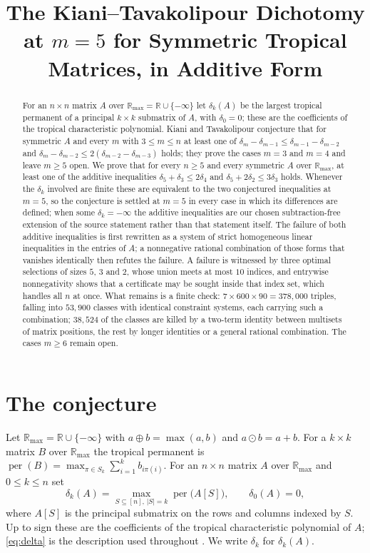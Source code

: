 \documentclass[11pt]{amsart}
\title[The Kiani--Tavakolipour dichotomy at $m=5$, in additive form]
{The Kiani--Tavakolipour Dichotomy at $m=5$ for Symmetric Tropical Matrices,
in Additive Form}
\date{}
\newcommand{\Rmax}{\mathbb R_{\max}}
\newcommand{\dd}{\delta}
\newcommand{\per}{\operatorname{per}}
\begin{document}
\begin{abstract}
For an $n\times n$ matrix $A$ over $\Rmax=\mathbb R\cup\{-\infty\}$ let
$\dd_k(A)$ be the largest tropical permanent of a principal $k\times k$
submatrix of $A$, with $\dd_0=0$; these are the coefficients of the tropical
characteristic polynomial. Kiani and Tavakolipour conjecture that for symmetric
$A$ and every $m$ with $3\le m\le n$ at least one of
$\dd_m-\dd_{m-1}\le\dd_{m-1}-\dd_{m-2}$ and
$\dd_m-\dd_{m-2}\le2(\dd_{m-2}-\dd_{m-3})$ holds; they prove the cases $m=3$ and
$m=4$ and leave $m\ge5$ open. We prove that for every $n\ge5$ and every
symmetric $A$ over $\Rmax$, at least one of the additive inequalities
$\dd_5+\dd_3\le2\dd_4$ and $\dd_5+2\dd_2\le3\dd_3$ holds. Whenever the $\dd_k$
involved are finite these are equivalent to the two conjectured inequalities at
$m=5$, so the conjecture is settled at $m=5$ in every case in which its
differences are
defined; when some $\dd_k=-\infty$ the additive inequalities are our chosen
subtraction-free extension of the source statement rather than that statement
itself. The failure of both additive inequalities is first rewritten as a system
of strict homogeneous linear inequalities in the entries of $A$; a nonnegative
rational combination of those forms that vanishes identically then refutes the
failure. A failure is witnessed by three optimal selections of sizes $5$, $3$
and $2$, whose union meets at most $10$ indices, and entrywise nonnegativity
shows that a certificate may be sought inside that index set, which handles all
$n$ at once. What remains is a finite check:
$7\times600\times90=378{,}000$ triples, falling into $53{,}900$ classes with
identical constraint systems, each carrying such a combination; $38{,}524$ of
the classes are killed by a two-term identity between multisets of matrix
positions, the rest by longer identities or a general rational combination. The
cases $m\ge6$ remain open.
\end{abstract}

\maketitle

\section{The conjecture}

Let $\Rmax=\mathbb R\cup\{-\infty\}$ with $a\oplus b=\max(a,b)$ and
$a\odot b=a+b$. For a $k\times k$ matrix $B$ over $\Rmax$ the tropical permanent
is $\per(B)=\max_{\pi\in S_k}\sum_{i=1}^k b_{i\pi(i)}$. For an $n\times n$
matrix $A$ over $\Rmax$ and $0\le k\le n$ set
\begin{equation}\label{eq:delta}
 \dd_k(A)=\max_{S\subseteq[n],\,|S|=k}\per\bigl(A[S]\bigr),
 \qquad \dd_0(A)=0,
\end{equation}
where $A[S]$ is the principal submatrix on the rows and columns indexed by $S$.
Up to sign these are the coefficients of the tropical characteristic polynomial
of $A$; \eqref{eq:delta} is the description used throughout
\cite[Thm.~2.6 and eq.~(2.3)]{KT}. We write $\dd_k$ for $\dd_k(A)$.
\end{document}
